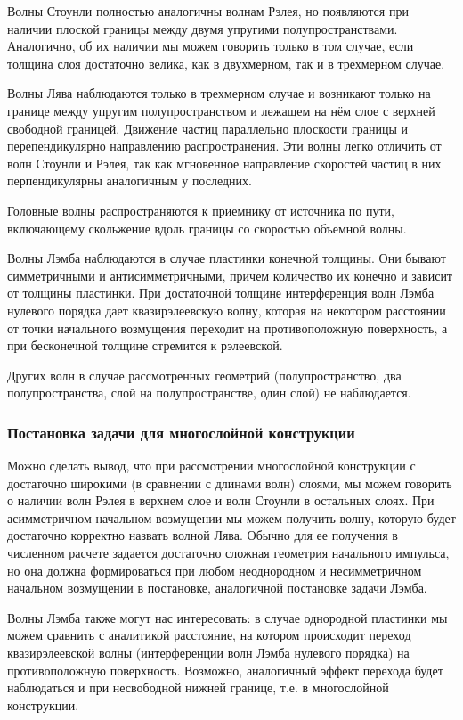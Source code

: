 Волны Стоунли полностью аналогичны волнам Рэлея, но появляются при наличии плоской границы между двумя упругими полупространствами. Аналогично, об их наличии мы можем говорить только в том случае, если толщина слоя достаточно велика, как в двухмерном, так и в трехмерном случае.

Волны Лява наблюдаются только в трехмерном случае и возникают только на границе между упругим полупространством и лежащем на нём слое с верхней свободной границей. Движение частиц параллельно плоскости границы и перепендикулярно направлению распространения. Эти волны легко отличить от волн Стоунли и Рэлея, так как мгновенное направление скоростей частиц в них перпендикулярны аналогичным у последних.

Головные волны распространяются к приемнику от источника по пути, включающему скольжение вдоль границы со скоростью объемной волны.

Волны Лэмба наблюдаются в случае пластинки конечной толщины. Они бывают симметричными и антисимметричными, причем количество их конечно и зависит от толщины пластинки. При достаточной толщине интерференция волн Лэмба нулевого порядка дает квазирэлеевскую волну, которая на некотором расстоянии от точки начального возмущения переходит на противоположную поверхность, а при бесконечной толщине стремится к рэлеевской. 

Других волн в случае рассмотренных геометрий (полупространство, два полупространства, слой на полупространстве, один слой) не наблюдается.


\subsubsection{Постановка задачи для многослойной конструкции}

Можно сделать вывод, что при рассмотрении многослойной конструкции с достаточно широкими (в сравнении с длинами волн) слоями, мы можем говорить о наличии волн Рэлея в верхнем слое и волн Стоунли в остальных слоях. При асимметричном начальном возмущении мы можем получить волну, которую будет достаточно корректно назвать волной Лява. Обычно для ее получения в численном расчете задается достаточно сложная геометрия начального импульса, но она должна формироваться при любом неоднородном и несимметричном начальном возмущении в постановке, аналогичной постановке задачи Лэмба.

Волны Лэмба также могут нас интересовать: в случае однородной пластинки мы можем сравнить с аналитикой расстояние, на котором происходит переход квазирэлеевской волны (интерференции волн Лэмба нулевого порядка) на противоположную поверхность. Возможно, аналогичный эффект перехода будет наблюдаться и при несвободной нижней границе, т.е. в многослойной конструкции.

